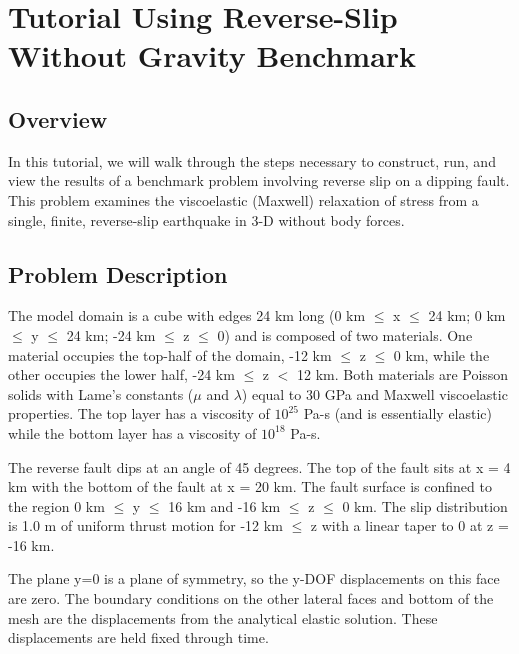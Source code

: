 \section{Tutorial Using Reverse-Slip Without Gravity Benchmark}

\subsection{Overview}

In this tutorial, we will walk through the steps necessary to
construct, run, and view the results of a benchmark problem involving
reverse slip on a dipping fault. This problem examines the
viscoelastic (Maxwell) relaxation of stress from a single, finite,
reverse-slip earthquake in 3-D without body forces.


\subsection{Problem Description}

The model domain is a cube with edges 24 km long (0 km $\leq$ x $\leq$
24 km; 0 km $\leq$ y $\leq$ 24 km; -24 km $\leq$ z $\leq$ 0) and
is composed of two materials. One material occupies the top-half of
the domain, -12 km $\leq$ z $\leq$ 0 km, while the other occupies
the lower half, -24 km $\leq$ z $<$ 12 km. Both materials are Poisson
solids with Lame's constants ($\mu$ and $\lambda$) equal to 30 GPa and
Maxwell viscoelastic properties. The top layer has a viscosity of
$10^25$ Pa-s (and is essentially elastic) while the bottom layer has a
viscosity of $10^18$ Pa-s.

The reverse fault dips at an angle of 45 degrees. The top of the fault
sits at x = 4 km with the bottom of the fault at x = 20 km. The fault
surface is confined to the region 0 km $\leq$ y $\leq$ 16 km and -16
km $\leq$ z $\leq$ 0 km. The slip distribution is 1.0 m of uniform
thrust motion for -12 km $\leq$ z with a linear taper to 0 at z = -16
km.

The plane y=0 is a plane of symmetry, so the y-DOF displacements on
this face are zero. The boundary conditions on the other lateral faces
and bottom of the mesh are the displacements from the analytical
elastic solution. These displacements are held fixed through time.

